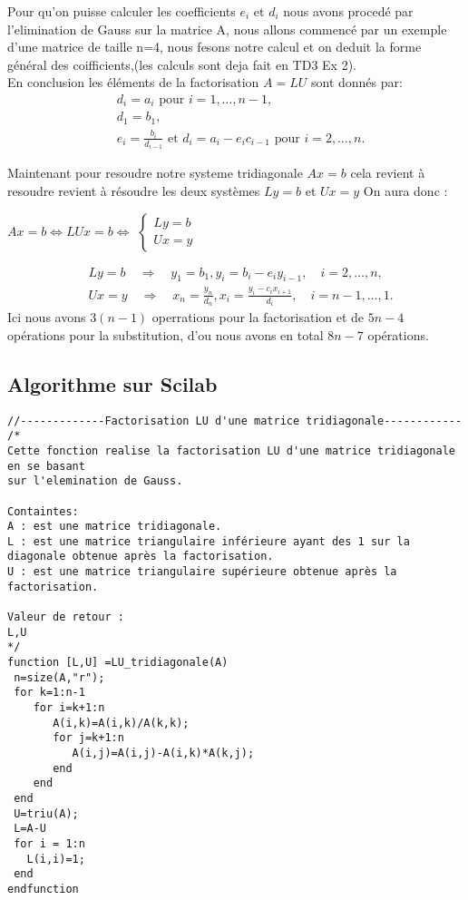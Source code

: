 \documentclass[12pt]{report}
\begin{document}
Pour qu'on puisse calculer les coefficients $e_{i}$ et $d_{i}$ nous avons procedé par l'elimination de Gauss sur la matrice A, nous allons commencé par un exemple d'une matrice de taille n=4, nous fesons notre calcul et on deduit la forme général des coifficients,(les calculs sont deja fait en TD3 Ex 2).\\


En conclusion les éléments de la factorisation $A=L U$ sont donnés par:
$$
\begin{aligned}
&d_{i}=a_{i} \text { pour } i=1, \ldots, n-1, \\
&d_{1}=b_{1}, \\
&e_{i}=\frac{b_{i}}{d_{i-1}} \text { et }d_{i}=a_{i}-e_{i} c_{i-1} \text { pour } i=2, \ldots, n .
\end{aligned}
$$

Maintenant pour resoudre notre systeme tridiagonale $Ax=b$ cela revient à resoudre revient à résoudre les deux systèmes  $Ly = b$ et $Ux = y$ On aura donc :
\begin{center}
	$Ax = b \Leftrightarrow LUx = b \Leftrightarrow $ $\left\{\begin{array}{l} Ly=b \\ Ux=y\end{array}\right.$
\end{center}

$$
\begin{aligned}
&Ly=b \quad \Rightarrow \quad y_{1}=b_{1}, y_{i}=b_{i}-e_{i} y_{i-1}, \quad i=2, \ldots, n, \\
&Ux=y \quad \Rightarrow \quad x_{n}=\frac{y_{n}}{d_{n}}, x_{i}=\frac{y_{i}-c_{i} x_{i+1}}{d_{i}}, \quad i=n-1, \ldots, 1 .
\end{aligned}
$$
Ici nous avons  $3(n-1)$ operrations pour la factorisation et de $5 n-4$ opérations pour la substitution, d'ou nous avons en total  $8 n-7$ opérations.

\subsection{Algorithme sur Scilab}

\begin{lstlisting}
//-------------Factorisation LU d'une matrice tridiagonale------------
/*
Cette fonction realise la factorisation LU d'une matrice tridiagonale en se basant 
sur l'elemination de Gauss.

Containtes:
A : est une matrice tridiagonale. 
L : est une matrice triangulaire inférieure ayant des 1 sur la diagonale obtenue après la factorisation.
U : est une matrice triangulaire supérieure obtenue après la factorisation.

Valeur de retour :
L,U
*/
function [L,U] =LU_tridiagonale(A)
 n=size(A,"r");
 for k=1:n-1
    for i=k+1:n
       A(i,k)=A(i,k)/A(k,k);
       for j=k+1:n
          A(i,j)=A(i,j)-A(i,k)*A(k,j);
       end
    end
 end
 U=triu(A);
 L=A-U
 for i = 1:n
   L(i,i)=1;
 end
endfunction

\end{lstlisting}
\end{document}
